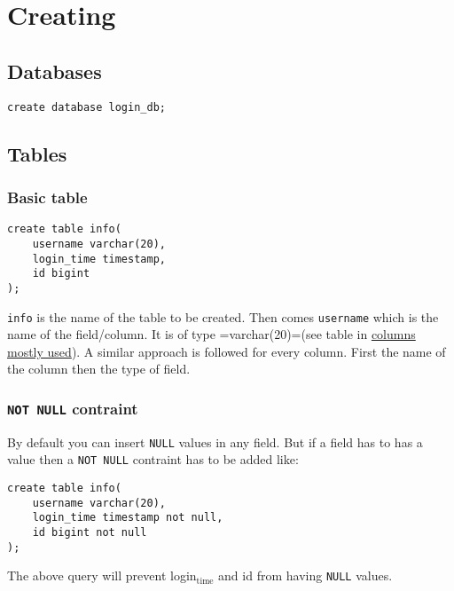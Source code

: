 \documentclass[11pt]{article}
\begin{document}
\section{Creating}
\label{sec:orgheadline15}
\subsection{Databases}
\label{sec:orgheadline11}
\begin{verbatim}
create database login_db;
\end{verbatim}
\subsection{Tables}
\label{sec:orgheadline14}
\subsubsection{Basic table}
\label{sec:orgheadline12}
\begin{verbatim}
create table info(
	username varchar(20),
	login_time timestamp,
	id bigint
);
\end{verbatim}
\texttt{info} is the name of the table to be created. Then
comes \texttt{username} which is the name of the field/column.
It is of type =varchar(20)=(see table in \hyperref[sec:orgheadline7]{columns mostly used}).
A similar approach is followed for every column. First
the name of the column then the type of field.
\subsubsection{\texttt{NOT NULL} contraint}
\label{sec:orgheadline13}
By default you can insert \texttt{NULL} values in any
field. But if a field has to has a value then
a \texttt{NOT NULL} contraint has to be added like:
\begin{verbatim}
create table info(
    username varchar(20),
    login_time timestamp not null,
    id bigint not null
);
\end{verbatim}
The above query will prevent login\(_{\text{time}}\) and id
from having \texttt{NULL} values.
\end{document}
